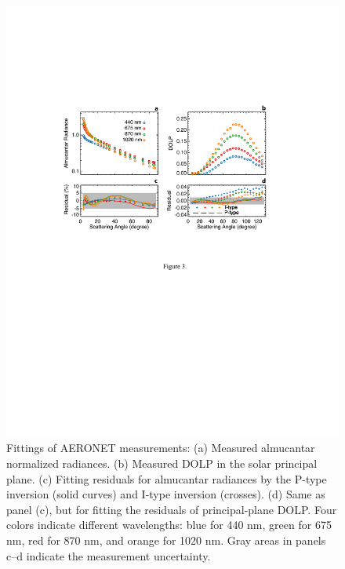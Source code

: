 \begin{figure}[t]
  \centering
  \includegraphics[width={\textwidth}]{figures/inv02.pdf}
  \caption[Fittings of AERONET measurements.]
  {Fittings of AERONET measurements: 
(a) Measured almucantar normalized radiances. (b) Measured DOLP in
the solar principal plane. (c) Fitting residuals for almucantar radiances by
the P-type inversion (solid curves) and I-type inversion (crosses). (d) Same as
panel (c), but for fitting the residuals of principal-plane DOLP. Four colors
indicate different wavelengths: blue for 440 nm, green for 675 nm, red for 870
nm, and orange for 1020 nm. Gray areas in panels c–d indicate the measurement
uncertainty.}
  \label{fig:invfit}
\end{figure}

